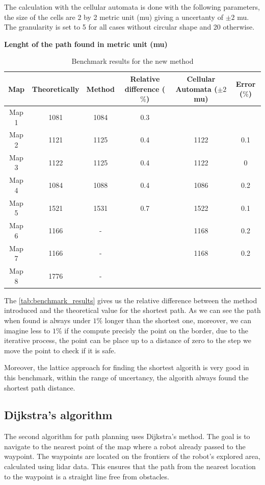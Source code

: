\documentclass[../main.tex]{subfiles}
\begin{document}
The calculation with the cellular automata is done with the following parameters, the size of the cells are 2 by 2 metric unit (mu) giving a uncertanty of $\pm 2$ mu. The granularity is set to 5 for all cases without circular shape and 20 otherwise.
\tobedone

\textbf{Lenght of the path found in metric unit (mu)}
\begin{table}[H]
	\centering
	\begin{tabular}{c c c c c c}
		\hline
		Map & Theoretically & Method & Relative difference ($\%$) & Cellular Automata ($\pm 2$ mu) & Error ($\%$)\\
		\hline
		Map 1 & 1081 & 1084 & 0.3 &  & \\
		Map 2 & 1121 & 1125 & 0.4 & 1122 & 0.1\\
		Map 3 & 1122 & 1125 & 0.4 & 1122 & 0\\
		Map 4 & 1084 & 1088 & 0.4 & 1086 & 0.2\\
		Map 5 & 1521 & 1531 & 0.7 & 1522 & 0.1\\
		Map 6 & 1166 & - &  & 1168 & 0.2\\
		Map 7 & 1166 & - &  & 1168 & 0.2\\
		Map 8 & 1776 & - &  &  & \\
		\hline
	\end{tabular}
	\caption{Benchmark results for the new method}
	\label{tab:benchmark_results}
\end{table}

The \autoref{tab:benchmark_results} gives us the relative difference between the method introduced and the theoretical value for the shortest path. As we can see the path when found is always under $1\%$ longer than the shortest one, moreover, we can imagine less to $1\%$ if the compute precisly the point on the border, due to the iterative process, the point can be place up to a distance of zero to the step we move the point to check if it is safe.

Moreover, the lattice approach for finding the shortest algorith is very good in this benchmark, within the range of uncertancy, the algorith always found the shortest path distance.


\subsection{Dijkstra's algorithm}

The second algorithm for path planning uses Dijkstra's method. The goal is to navigate to the nearest point of the map where a robot already passed to the waypoint. The waypoints are located on the frontiers of the robot's explored area, calculated using lidar data. This ensures that the path from the nearest location to the waypoint is a straight line free from obstacles. 
\end{document}
